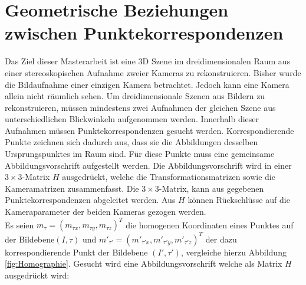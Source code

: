\chapter{Geometrische Beziehungen zwischen Punktekorrespondenzen}
\label{sec:HFE}

Das Ziel dieser Masterarbeit ist eine 3D Szene im dreidimensionalen Raum aus einer stereoskopischen Aufnahme zweier Kameras zu rekonstruieren. Bisher wurde die Bildaufnahme einer einzigen Kamera betrachtet. Jedoch kann eine Kamera allein nicht räumlich sehen. Um dreidimensionale Szenen aus Bildern zu rekonstruieren, müssen mindestens zwei Aufnahmen der gleichen Szene aus unterschiedlichen Blickwinkeln aufgenommen werden. Innerhalb dieser Aufnahmen müssen Punktekorrespondenzen gesucht werden. Korrespondierende Punkte zeichnen sich dadurch aus, dass sie die Abbildungen desselben Ursprungspunktes im Raum sind. Für diese Punkte muss eine gemeinsame Abbildungsvorschrift aufgestellt werden. Die Abbildungsvorschrift wird in einer $3 \times 3$-Matrix $H$ ausgedrückt, welche die Transformationsmatrizen sowie die Kameramatrizen zusammenfasst. Die $3 \times 3$-Matrix, kann aus gegebenen Punktekorrespondenzen abgeleitet werden. Aus $H$ können Rückschlüsse auf die Kameraparameter der beiden Kameras gezogen werden.  \\


%

Es seien \ensuremath{m_{\tau} =(m_{\tau x},m_{\tau y},m_{\tau z})^T} die homogenen Koordinaten eines Punktes auf der Bildebene$(I,\tau)$ und \ensuremath{m'_{\tau'} = (m'_{\tau'x},m'_{\tau'y},m'_{\tau'z})^T} der dazu korrespondierende Punkt der Bildebene $(I',\tau')$, vergleiche hierzu Abbildung \ref{fig:Homographie}. Gesucht wird eine Abbildungsvorschrift welche als Matrix $H$ ausgedrückt wird:

